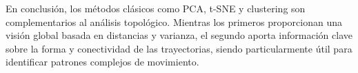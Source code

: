 En conclusión, los métodos clásicos como PCA, t-SNE y clustering son complementarios al análisis topológico. Mientras los primeros proporcionan una visión global basada en distancias y varianza, el segundo aporta información clave sobre la forma y conectividad de las trayectorias, siendo particularmente útil para identificar patrones complejos de movimiento.













